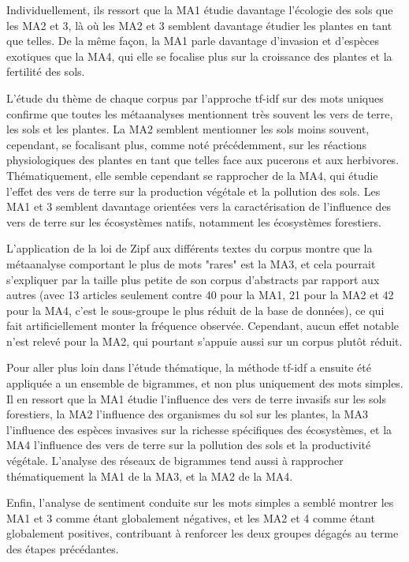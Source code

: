 \documentclass{book}
\begin{document}
Individuellement, ils ressort que la MA1 étudie davantage l'écologie des sols que les MA2 et 3, là où les MA2 et 3 semblent davantage étudier les plantes en tant que telles. De la même façon, la MA1 parle davantage d'invasion et d'espèces exotiques que la MA4, qui elle se focalise plus sur la croissance des plantes et la fertilité des sols.  

L'étude du thème de chaque corpus par l'approche tf-idf sur des mots uniques confirme que toutes les métaanalyses mentionnent très souvent les vers de terre, les sols et les plantes. La MA2 semblent mentionner les sols moins souvent, cependant, se focalisant plus, comme noté précédemment, sur les réactions physiologiques des plantes en tant que telles face aux pucerons et aux herbivores. Thématiquement, elle semble cependant se rapprocher de la MA4, qui étudie l'effet des vers de terre sur la production végétale et la pollution des sols. Les MA1 et 3 semblent davantage orientées vers la caractérisation de l'influence des vers de terre sur les écosystèmes natifs, notamment les écosystèmes forestiers.

L'application de la loi de Zipf aux différents textes du corpus montre que la métaanalyse comportant le plus de mots "rares" est la MA3, et cela pourrait s'expliquer par la taille plus petite de son corpus d'abstracts par rapport aux autres (avec 13 articles seulement contre 40 pour la MA1, 21 pour la MA2 et 42 pour la MA4, c'est le sous-groupe le plus réduit de la base de données), ce qui fait artificiellement monter la fréquence observée. Cependant, aucun effet notable n'est relevé pour la MA2, qui pourtant s'appuie aussi sur un corpus plutôt réduit.

Pour aller plus loin dans l'étude thématique, la méthode tf-idf a ensuite été appliquée a un ensemble de bigrammes, et non plus uniquement des mots simples. Il en ressort que la MA1 étudie l'influence des vers de terre invasifs sur les sols forestiers, la MA2 l'influence des organismes du sol sur les plantes, la MA3 l'influence des espèces invasives sur la richesse spécifiques des écosystèmes, et la MA4 l'influence des vers de terre sur la pollution des sols et la productivité végétale. L'analyse des réseaux de bigrammes tend aussi à rapprocher thématiquement la MA1 de la MA3, et la MA2 de la MA4. 

Enfin, l'analyse de sentiment conduite sur les mots simples a semblé montrer les MA1 et 3 comme étant globalement négatives, et les MA2 et 4 comme étant globalement positives, contribuant à renforcer les deux groupes dégagés au terme des étapes précédantes.
\end{document}
